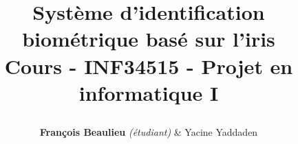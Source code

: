 \title{\parbox{0.76\linewidth}{\centering Système d'identification biométrique basé sur l'iris \\ \vspace{0.3em} \LARGE{Cours - \textbf{INF34515} - Projet en informatique I} \vspace{0.3em}}}

\author{
\textbf{François Beaulieu} \textit{(étudiant)}
\& 
Yacine Yaddaden%
}


